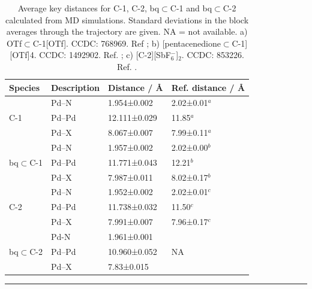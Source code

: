 \documentclass[../../main.tex]{subfiles}
\begin{document}
\begin{table}[h]
	\def\arraystretch{1.7}
	\begin{tabularx}{\textwidth}{YYYY}
		\hline		
		Species &	Description	&Distance / \AA&	Ref. distance / \AA \\
		\hline
		
			  & Pd–N&	1.954±0.002	&2.02±0.01$^a$
\\
		 C-1 &        	Pd–Pd&	12.111±0.029&	11.85$^a$
\\
			&	Pd–X	&8.067±0.007	&7.99±0.11$^a
$\\
						&	Pd–N&	1.957±0.002	&2.02±0.00$^b$
\\
		bq$\subset$C-1	&	Pd–Pd	&11.771±0.043&	12.21$^b$
\\
			&	Pd–X&	7.987±0.011	&8.02±0.17$^b$
\\
		&Pd–N&	1.952±0.002	&2.02±0.01$^c$
\\
			C-2		&Pd–Pd	&11.738±0.032	&11.50$^c
$\\
				&Pd–X	&7.991±0.007&	7.96±0.17$^c$
\\
			&Pd-N&	1.961±0.001	
&\\
			bq$\subset$C-2	&Pd–Pd	&10.960±0.052&	NA
\\
				&Pd–X&	7.83±0.015	&
\\
	
	\end{tabularx}
	\hrule
	\vspace{0.2cm}
	\caption{Average key distances for C-1, C-2, bq$\subset$C-1 and bq$\subset$C-2 calculated from MD simulations. Standard deviations in the block averages through the trajectory are given. NA = not available. a) OTf$\subset$C-1[OTf]. CCDC: 768969. Ref \cite{Liao2010}; b) [pentacenedione$\subset$C-1][OTf]4. CCDC: 1492902. Ref. \cite{August2016}; c) [C-2][SbF$_6^{-}$]$_2$. CCDC: 853226. Ref. \cite{Lewis2012}.}
	\label{table::si_da_2}
\end{table}
\end{document}
